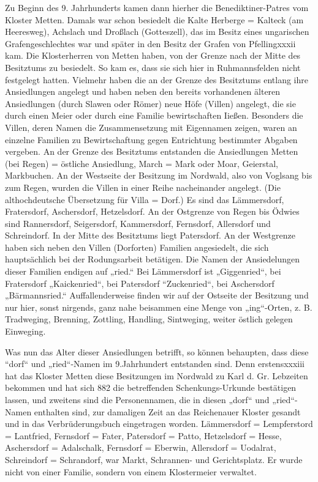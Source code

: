 \documentclass[12pt,a4paper]{book}
\begin{document}
Zu Beginn des 9. Jahrhunderts kamen dann hierher die Benediktiner-Patres vom
Kloster Metten. Damals war schon besiedelt die Kalte Herberge = Kalteck (am
Heeresweg), Achslach und Droßlach (Gotteszell), das im Besitz eines ungarischen
Grafengeschlechtes war und später in den Besitz der Grafen von Pfellingxxxii
kam. Die Klosterherren von Metten haben, von der Grenze nach der Mitte des
Besitztums zu besiedelt. So kam es, dass sie sich hier in Ruhmannsfelden nicht
festgelegt hatten. Vielmehr haben die an der Grenze des Besitztums entlang ihre
Ansiedlungen angelegt und haben neben den bereits vorhandenen älteren
Ansiedlungen (durch Slawen oder Römer) neue Höfe (Villen) angelegt, die sie
durch einen Meier oder durch eine Familie bewirtschaften Iießen. Besonders die
Villen, deren Namen die Zusammensetzung mit Eigennamen zeigen, waren an einzelne
Familien zu Bewirtschaftung gegen Entrichtung bestimmter Abgaben vergeben. An
der Grenze des Besitztums entstanden die Ansiedlungen Metten (bei Regen) =
östliche Ansiedlung, March = Mark oder Moar, Geierstal, Markbuchen. An der
Westseite der Besitzung im Nordwald, also von Voglsang bis zum Regen, wurden die
Villen in einer Reihe nacheinander angelegt. (Die althochdeutsche Übersetzung
für Villa = Dorf.) Es sind das Lämmersdorf, Fratersdorf, Aschersdorf,
Hetzelsdorf. An der Ostgrenze von Regen bis Ödwies sind Rannersdorf,
Seigersdorf, Kammersdorf, Fernsdorf, Allersdorf und Schreindorf. In der Mitte
des Besitztums liegt Patersdorf. An der Westgrenze haben sich neben den Villen
(Dorforten) Familien angesiedelt, die sich hauptsächlich bei der Rodungsarbeit
betätigen. Die Namen der Ansiedelungen dieser Familien endigen auf „ried.“ Bei
Lämmersdorf ist „Giggenried“, bei Fratersdorf „Kaickenried“, bei Patersdorf
“Zuckenried“, bei Aschersdorf „Bärmannsried.“ Auffallenderweise finden wir auf
der Ostseite der Besitzung und nur hier, sonst nirgends, ganz nahe beisammen
eine Menge von „ing“-Orten, z. B. Tradweging, Brenning, Zottling, Handling,
Sintweging, weiter östlich gelegen Einweging.

Was nun das Alter dieser Ansiedlungen betrifft, so können behaupten, dass diese
“dorf“ und „ried“-Namen im 9.Jahrhundert entstanden sind. Denn erstensxxxiii hat
das Kloster Metten diese Besitzungen im Nordwald zu Karl d. Gr. Lebzeiten
bekommen und hat sich 882 die betreffenden Schenkungs-Urkunde bestätigen lassen,
und zweitens sind die Personennamen, die in diesen „dorf“ und „ried“-Namen
enthalten sind, zur damaligen Zeit an das Reichenauer Kloster gesandt und in das
Verbrüderungsbuch eingetragen worden. Lämmersdorf = Lempferstord = Lantfried,
Fernsdorf = Fater, Patersdorf = Patto, Hetzelsdorf = Hesse, Aschersdorf =
Adalschalk, Fernsdorf = Eberwin, Allersdorf = Uodalrat, Schreindorf =
Schrandorf, war Markt, Schrannen- und Gerichtsplatz. Er wurde nicht von einer
Familie, sondern von einem Klostermeier verwaltet.
\end{document}
